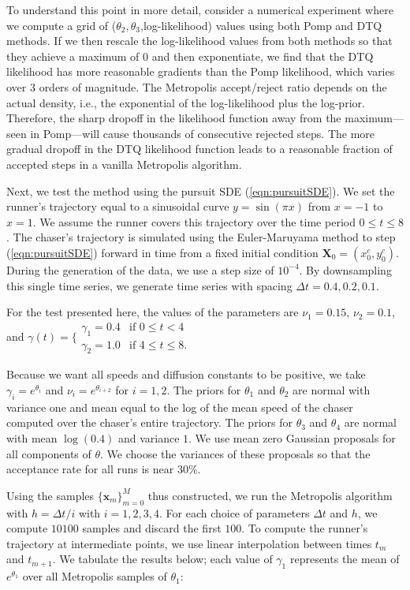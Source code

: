 \documentclass[graybox]{svmult}
\begin{document}
To understand this point in more detail, consider a numerical experiment where we compute a grid of ($\theta_2,\theta_3$,log-likelihood) values using both Pomp and DTQ methods. If we then rescale the log-likelihood values from both methods so that they achieve a maximum of 0 and then exponentiate, we find that the DTQ likelihood has more reasonable gradients than the Pomp likelihood, which varies over 3 orders of magnitude. The Metropolis accept/reject ratio depends on the actual density, i.e., the exponential of the log-likelihood plus the log-prior.  Therefore, the sharp dropoff in the likelihood function away from the maximum---seen in Pomp---will cause thousands of consecutive rejected steps. The more gradual dropoff in the DTQ likelihood function leads to a reasonable fraction of accepted steps in a vanilla Metropolis algorithm.

Next, we test the method using the pursuit SDE
(\ref{eqn:pursuitSDE}).  We set the runner's trajectory equal to a
sinusoidal curve $y = \sin (\pi x)$ from $x=-1$ to $x=1$.  We assume
the runner covers this trajectory over the time period $0 \leq t \leq
8$.  The chaser's trajectory is simulated using the Euler-Maruyama
method to step (\ref{eqn:pursuitSDE}) forward in time from a fixed
initial condition $\mathbf{X}_0 = (x^c_0, y^c_0)$.  During the
generation of the data, we use a step size of $10^{-4}$.  By
downsampling this single time series, we generate time series with
spacing $\Delta t = 0.4, 0.2, 0.1$.  

For the test presented here, the values of the parameters are  $\nu_1
= 0.15$, $\nu_2 = 0.1$, and $\gamma(t) =
\biggl\{
	\begin{array}{ll}
		\gamma_1 = 0.4  & \mbox{if } 0 \leq t < 4 \\
		\gamma_2 = 1.0 & \mbox{if } 4 \leq t \leq 8.
	\end{array}$

Because we want all speeds and diffusion constants to be positive, we
take $\gamma_i = e^{\theta_i}$ and $\nu_i = e^{\theta_{i+2}}$ for $i =
1, 2$.  The priors for $\theta_1$ and $\theta_2$ are normal with
variance one and mean equal to the log of the mean speed of the chaser computed over the chaser's
entire trajectory. The priors for $\theta_3$ and $\theta_4$ are normal with mean
$\log(0.4)$ and variance $1$.  We use mean zero Gaussian proposals for all
components of $\theta$.  We choose the variances of these proposals so
that the acceptance rate for all runs is near $30\%$.

Using the samples $\{\mathbf{x}_m\}^M_{m=0}$ thus constructed, we run
the Metropolis algorithm with $h = \Delta t / i$ with $i = 1, 2, 3,
4$.  For each choice of parameters $\Delta t$ and $h$, we compute $10100$ samples and discard the first $100$.  To compute the runner's trajectory at intermediate points, we use
linear interpolation between times $t_m$ and $t_{m+1}$.  We tabulate
the results below; each value of $\gamma_1$ represents the mean of
$e^{\theta_1}$ over all Metropolis samples of $\theta_1$:
\end{document}
